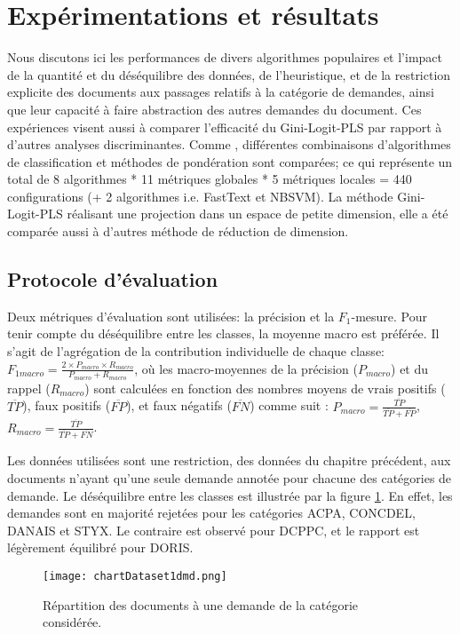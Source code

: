 \section{Expérimentations et résultats}
\label{sec:sensresultat:experimentations}
Nous discutons ici les performances de divers algorithmes populaires et l'impact de la quantité et du déséquilibre des données, de l'heuristique, et de la restriction explicite des documents aux passages relatifs à la catégorie de demandes, ainsi que leur capacité à faire abstraction des autres demandes du document. {Ces expériences visent aussi à comparer l'efficacité du Gini-Logit-PLS par rapport à d'autres analyses discriminantes}.  Comme \citet{im2017textclasstermweighting}, différentes combinaisons d'algorithmes de classification et méthodes de pondération  sont comparées; ce qui représente un total de 8 algorithmes * 11 métriques globales * 5 métriques locales = 440 configurations (+ 2 algorithmes i.e. FastText et NBSVM). La méthode Gini-Logit-PLS réalisant une projection dans un espace de petite dimension, elle a été comparée aussi à d'autres méthode de réduction de dimension.

\subsection{Protocole d'évaluation}
Deux métriques d'évaluation sont utilisées: la précision et la $F_1$-mesure. Pour tenir compte du déséquilibre entre les classes, la moyenne macro est préférée. Il s'agit de l'agrégation de la contribution individuelle de chaque classe: $F_{1macro} = \frac{2 \times P_{macro} \times R_{macro}}{P_{macro} + R_{macro}}$, où les macro-moyennes de la précision ($P_{macro}$) et du rappel ($R_{macro}$) sont calculées en fonction des nombres moyens de vrais positifs ($\overline{TP}$), faux positifs ($\overline{FP}$), et faux négatifs ($\overline{FN}$) comme suit \citep{van2013macromicroeval}:
$P_{macro} = \frac{\overline{TP}}{\overline{TP} + \overline{FP}}$, $R_{macro} = \frac{\overline{TP}}{\overline{TP} + \overline{FN}}$.


Les données utilisées sont une restriction, des données du chapitre précédent, aux documents n'ayant qu'une seule demande annotée pour chacune des catégories de demande. Le déséquilibre entre les classes est illustrée par la figure \ref{fig:sensresultat:stat-1dmd}. En effet, les demandes sont en majorité rejetées pour les catégories ACPA, CONCDEL, DANAIS et STYX. Le contraire est observé pour DCPPC, et le rapport est légèrement équilibré pour DORIS.
\begin{figure}[htb]
\texttt{[image: chartDataset1dmd.png]}
\caption{Répartition des documents à une demande de la catégorie considérée.}\label{fig:sensresultat:stat-1dmd}
\end{figure}

